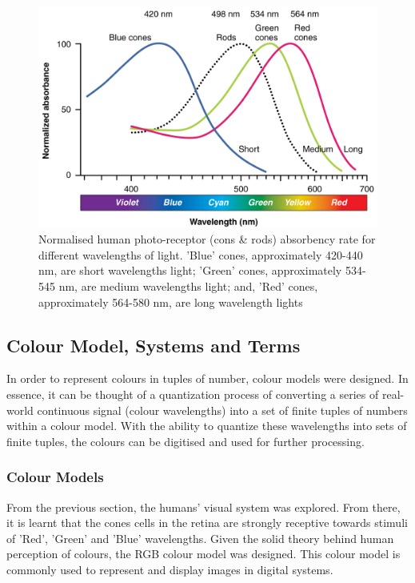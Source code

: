 \begin{figure}[hbt!]\centering
\includegraphics[width=.7\textwidth]{image/lit/ColorSensitivity.jpg}
\caption[Normalised human photo-receptor absorbency rate for different wavelength lights]{Normalised human photo-receptor (cons \& rods) absorbency rate for different wavelengths of light. 'Blue' cones, approximately 420-440 nm, are short wavelengths light; 'Green' cones, approximately 534-545 nm, are medium wavelengths light; and, 'Red' cones, approximately 564-580 nm, are long wavelength lights }
\label{fig:visibleSpectrum}
\end{figure}




\subsection{Colour Model, Systems and Terms}
\label{section:colourterm}

In order to represent colours in tuples of number, colour models were designed. In essence, it can be thought of a quantization process of converting a series of real-world continuous signal (colour wavelengths) into a set of finite tuples of numbers within a colour model. 
With the ability to quantize these wavelengths into sets of finite tuples, the colours can be digitised and used for further processing.


\subsubsection{Colour Models}
From the previous section, the humans' visual system was explored. From there, it is learnt that the cones cells in the retina are strongly receptive towards stimuli of 'Red', 'Green' and 'Blue' wavelengths. Given the solid theory behind human perception of colours, the RGB colour model was designed. This colour model is commonly used to represent and display images in digital systems. 

